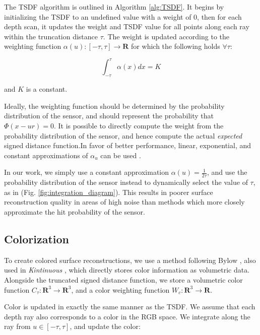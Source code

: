 \documentclass[10pt,twocolumn,letterpaper]{article}
\begin{document}
The TSDF algorithm is outlined in Algorithm \ref{alg:TSDF}. It begins by
initializing the TSDF to an undefined value with a weight of $0$, then for each
depth scan, it updates the weight and TSDF value for all points along each ray
within the truncation distance $\tau$. The weight is updated according
to the weighting function $\alpha(u) : [-\tau,\tau]\to \mathbf{R} $  for which
the following holds $\forall \tau$:

\begin{equation}
	\int_{-\tau}^{\tau} \alpha(x) dx = K 
\end{equation}
 
 \noindent and $K$ is a constant.
 
Ideally, the weighting function should be determined by the probability distribution of the sensor, and should represent
the probability that $\Phi(x - u r) = 0$. It is possible \cite{Nguyen2012} to
directly compute the weight from the probability distribution of the sensor, and hence compute
the actual \emph{expected} signed distance function.In favor of better
performance, linear, exponential, and constant approximations of $\alpha_u$ can
be used \cite{Curless1996, Newcombe, Whelan2013, Bylow2013}.

In our work, we simply use a constant approximation $\alpha(u) = \frac{1}{2
\tau}$, and use the probability distribution of the sensor instead to 
dynamically select the value of $\tau$, as in \cite{Nguyen2012} (Fig.
\ref{fig:integration_diagram}). This results in poorer surface reconstruction
quality in areas of high noise than methods which more closely approximate the
hit probability of the sensor.

\subsection{Colorization}
To create colored surface reconstructions, we use a method following Bylow
\etal \cite{Bylow2013}, also used in \textit{Kintinuous} \cite{Whelan2013},
which directly stores color information as volumetric data. Alongside the
truncated signed distance function, we store a volumetric color function
$C_\tau : \mathbf{R}^3 \to \mathbf{R}^3$, and a color weighting function $W_c :
\mathbf{R}^3 \to \mathbf{R}$.

Color is updated in exactly the same manner as the TSDF. We assume that each
depth ray also corresponds to a color in the RGB space. We integrate along the
ray from $u \in [-\tau, \tau]$, and update the color:
\end{document}
